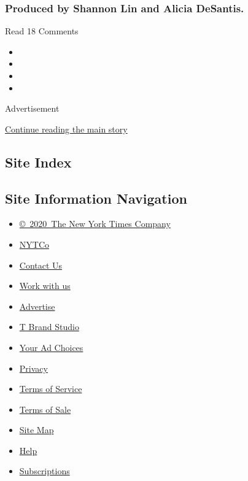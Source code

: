 \hypertarget{produced-by-shannon-lin-and-alicia-desantis}{%
\subsubsection{Produced by Shannon Lin and Alicia
DeSantis.}\label{produced-by-shannon-lin-and-alicia-desantis}}

Read 18 Comments

\begin{itemize}
\item
\item
\item
\item
\end{itemize}

Advertisement

\protect\hyperlink{after-bottom}{Continue reading the main story}

\hypertarget{site-index}{%
\subsection{Site Index}\label{site-index}}

\hypertarget{site-information-navigation}{%
\subsection{Site Information
Navigation}\label{site-information-navigation}}

\begin{itemize}
\tightlist
\item
  \href{https://help.nytimes.com/hc/en-us/articles/115014792127-Copyright-notice}{©~2020~The
  New York Times Company}
\end{itemize}

\begin{itemize}
\tightlist
\item
  \href{https://www.nytco.com/}{NYTCo}
\item
  \href{https://help.nytimes.com/hc/en-us/articles/115015385887-Contact-Us}{Contact
  Us}
\item
  \href{https://www.nytco.com/careers/}{Work with us}
\item
  \href{https://nytmediakit.com/}{Advertise}
\item
  \href{http://www.tbrandstudio.com/}{T Brand Studio}
\item
  \href{https://www.nytimes.com/privacy/cookie-policy\#how-do-i-manage-trackers}{Your
  Ad Choices}
\item
  \href{https://www.nytimes.com/privacy}{Privacy}
\item
  \href{https://help.nytimes.com/hc/en-us/articles/115014893428-Terms-of-service}{Terms
  of Service}
\item
  \href{https://help.nytimes.com/hc/en-us/articles/115014893968-Terms-of-sale}{Terms
  of Sale}
\item
  \href{https://spiderbites.nytimes.com}{Site Map}
\item
  \href{https://help.nytimes.com/hc/en-us}{Help}
\item
  \href{https://www.nytimes.com/subscription?campaignId=37WXW}{Subscriptions}
\end{itemize}
